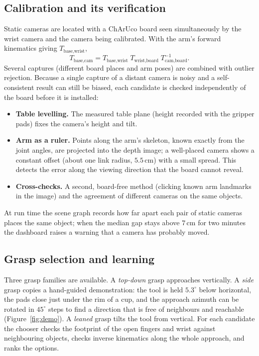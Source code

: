 \documentclass[12pt]{article}
\begin{document}
\subsection{Calibration and its verification}
\label{sec:calibration}

Static cameras are located with a ChArUco board seen simultaneously by the wrist camera and the camera being calibrated. With the arm's forward kinematics giving $T_{\text{base,wrist}}$,
\begin{equation}
  T_{\text{base,cam}} = T_{\text{base,wrist}}\; T_{\text{wrist,board}}\; T_{\text{cam,board}}^{-1}.
\end{equation}
Several captures (different board places and arm poses) are combined with outlier rejection. Because a single capture of a distant camera is noisy and a self-consistent result can still be biased, each candidate is checked independently of the board before it is installed:
\begin{itemize}
  \item \textbf{Table levelling.} The measured table plane (height recorded with the gripper pads) fixes the camera's height and tilt.
  \item \textbf{Arm as a ruler.} Points along the arm's skeleton, known exactly from the joint angles, are projected into the depth image; a well-placed camera shows a constant offset (about one link radius, $5.5$\,cm) with a small spread. This detects the error along the viewing direction that the board cannot reveal.
  \item \textbf{Cross-checks.} A second, board-free method (clicking known arm landmarks in the image) and the agreement of different cameras on the same objects.
\end{itemize}
At run time the scene graph records how far apart each pair of static cameras places the same object; when the median gap stays above $7$\,cm for two minutes the dashboard raises a warning that a camera has probably moved.

\subsection{Grasp selection and learning}
\label{sec:grasp}

Three grasp families are available. A \emph{top-down} grasp approaches vertically. A \emph{side} grasp copies a hand-guided demonstration: the tool is held $5.3^\circ$ below horizontal, the pads close just under the rim of a cup, and the approach azimuth can be rotated in $45^\circ$ steps to find a direction that is free of neighbours and reachable (Figure~\ref{fig:demo}). A \emph{leaned} grasp tilts the tool from vertical. For each candidate the chooser checks the footprint of the open fingers and wrist against neighbouring objects, checks inverse kinematics along the whole approach, and ranks the options.
\end{document}
